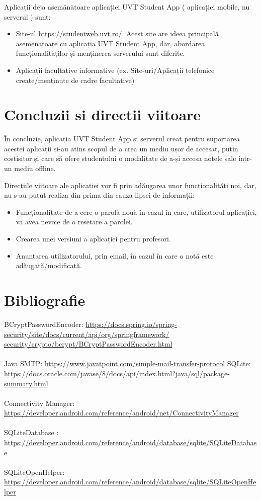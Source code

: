 \documentclass{article}
\begin{document}
	 Aplicații deja asemănătoare aplicației UVT Student App ( aplicației mobile, nu serverul ) sunt:
	\begin{itemize}
		\item Site-ul \url{https://studentweb.uvt.ro/}.
			Acest site are ideea principală asemenatoare cu aplicația UVT Student App, dar, abordarea funcționalităților și menținerea serverului sunt diferite.
		\item Aplicații facultative informative (ex. Site-uri/Aplicații telefonice create/menținute de cadre facultative)
	\end{itemize}

	\newpage
	\section{Concluzii si directii viitoare}

	În concluzie, aplicația UVT Student App și serverul creat pentru suportarea acestei aplicații și-au atins scopul de a crea un mediu ușor de accesat, puțin costisitor și care să ofere studentului o modalitate de a-și accesa notele sale într-un mediu offline. 

 Direcțiile viitoare ale aplicației vor fi prin adăugarea unor funcționalități noi, dar, nu s-au putut realiza din prima din cauza lipsei de informații:
	\begin{itemize}
		\item Funcționalitate de a cere o parolă nouă în cazul în care, utilizatorul aplicației, va avea nevoie de o resetare a parolei.
		\item Crearea unei versiuni a aplicației pentru profesori.
		\item Anunțarea utilizatorului, prin email, în cazul în care o notă este adăugată/modificată.
	\end{itemize}

	\newpage
	\section{Bibliografie} \label{Bibliografie}
	
	\vspace{1cm}

		BCryptPasswordEncoder: \url{https://docs.spring.io/spring-security/site/docs/current/api/org/springframework/
security/crypto/bcrypt/BCryptPasswordEncoder.html}\label{PasswordEncoder}\\ \\
		Java SMTP: \url{https://www.javatpoint.com/simple-mail-transfer-protocol} \label{SMTP}
		SQLite: \url{https://docs.oracle.com/javase/8/docs/api/index.html?java/sql/package-summary.html}\label{SQL} \\ \\
		Connectivity Manager: \url{https://developer.android.com/reference/android/net/ConnectivityManager}\label{ConnMan} \\ \\
		SQLiteDatabase : \url{https://developer.android.com/reference/android/database/sqlite/SQLiteDatabase}\label{SQLiteDatabase} \\ \\
		SQLiteOpenHelper: \url{https://developer.android.com/reference/android/database/sqlite/SQLiteOpenHelper}\label{SQLiteOpenHelper}
		
\end{document}
